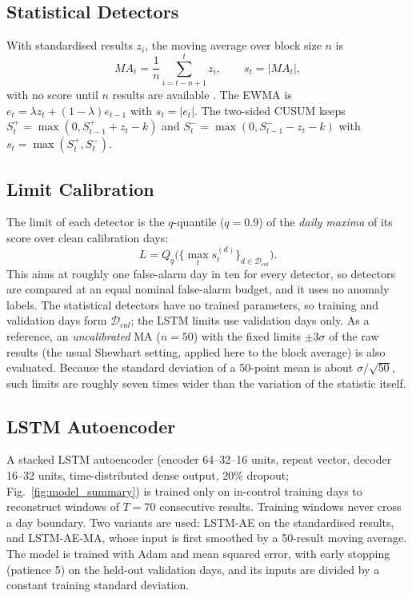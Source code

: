 \documentclass[conference]{IEEEtran}
\begin{document}
\subsection{Statistical Detectors}
With standardised results $z_i$, the moving average over block size $n$ is
\[
MA_t = \frac{1}{n}\sum_{i=t-n+1}^{t} z_i, \qquad s_t = |MA_t|,
\]
with no score until $n$ results are available \cite{Bietenbeck2020}. The EWMA is $e_t=\lambda z_t+(1-\lambda)e_{t-1}$ with $s_t=|e_t|$. The two-sided CUSUM keeps $S^{+}_t=\max(0,S^{+}_{t-1}+z_t-k)$ and $S^{-}_t=\max(0,S^{-}_{t-1}-z_t-k)$ with $s_t=\max(S^{+}_t,S^{-}_t)$.

\subsection{Limit Calibration}
\label{sec:calibration}
The limit of each detector is the $q$-quantile ($q=0.9$) of the \emph{daily maxima} of its score over clean calibration days:
\[
L=Q_q\Big(\big\{\max_t s^{(d)}_t\big\}_{d\in\mathcal{D}_{cal}}\Big).
\]
This aims at roughly one false-alarm day in ten for every detector, so detectors are compared at an equal nominal false-alarm budget, and it uses no anomaly labels. The statistical detectors have no trained parameters, so training and validation days form $\mathcal{D}_{cal}$; the LSTM limits use validation days only. As a reference, an \emph{uncalibrated} MA ($n=50$) with the fixed limits $\pm3\sigma$ of the raw results (the usual Shewhart setting, applied here to the block average) is also evaluated. Because the standard deviation of a 50-point mean is about $\sigma/\sqrt{50}$, such limits are roughly seven times wider than the variation of the statistic itself.

\subsection{LSTM Autoencoder}
A stacked LSTM autoencoder (encoder 64--32--16 units, repeat vector, decoder 16--32 units, time-distributed dense output, 20\% dropout; Fig.~\ref{fig:model_summary}) is trained only on in-control training days to reconstruct windows of $T=70$ consecutive results. Training windows never cross a day boundary. Two variants are used: LSTM-AE on the standardised results, and LSTM-AE-MA, whose input is first smoothed by a 50-result moving average. The model is trained with Adam and mean squared error, with early stopping (patience 5) on the held-out validation days, and its inputs are divided by a constant training standard deviation.
\end{document}
